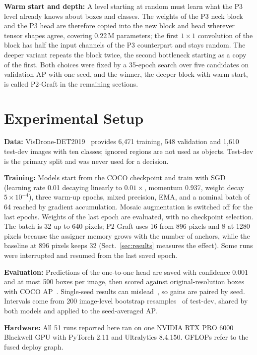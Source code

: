 \documentclass[runningheads]{llncs}
\begin{document}
\textbf{Warm start and depth:} A level starting at random must learn what the P3 level already knows about boxes and classes. The weights of the P3 neck block and the P3 head are therefore copied into the new block and head wherever tensor shapes agree, covering 0.22\,M parameters; the first $1{\times}1$ convolution of the block has half the input channels of the P3 counterpart and stays random. The deeper variant repeats the block twice, the second bottleneck starting as a copy of the first. Both choices were fixed by a 35-epoch search over five candidates on validation AP with one seed, and the winner, the deeper block with warm start, is called P2-Graft in the remaining sections.

\section{Experimental Setup}\label{sec:setup}
\textbf{Data:} VisDrone-DET2019~\cite{du2019visdrone} provides 6,471 training, 548 validation and 1,610 test-dev images with ten classes; ignored regions are not used as objects. Test-dev is the primary split and was never used for a decision.

\textbf{Training:} Models start from the COCO checkpoint and train with SGD (learning rate 0.01 decaying linearly to $0.01\times$, momentum 0.937, weight decay $5{\times}10^{-4}$), three warm-up epochs, mixed precision, EMA, and a nominal batch of 64 reached by gradient accumulation. Mosaic augmentation is switched off for the last epochs. Weights of the last epoch are evaluated, with no checkpoint selection. The batch is 32 up to 640 pixels; P2-Graft uses 16 from 896 pixels and 8 at 1280 pixels because the assigner memory grows with the number of anchors, while the baseline at 896 pixels keeps 32 (Sect.~\ref{sec:results} measures the effect). Some runs were interrupted and resumed from the last saved epoch.

\textbf{Evaluation:} Predictions of the one-to-one head are saved with confidence 0.001 and at most 500 boxes per image, then scored against original-resolution boxes with COCO AP~\cite{lin2014coco}. Single-seed results can mislead~\cite{bouthillier2021variance}, so gains are paired by seed. Intervals come from 200 image-level bootstrap resamples~\cite{efron1979bootstrap} of test-dev, shared by both models and applied to the seed-averaged AP.

\textbf{Hardware:} All 51 runs reported here ran on one NVIDIA RTX PRO 6000 Blackwell GPU with PyTorch 2.11 and Ultralytics 8.4.150. GFLOPs refer to the fused deploy graph.
\end{document}
